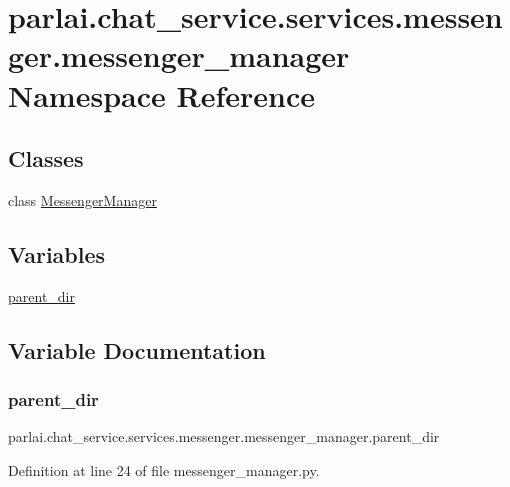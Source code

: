 \hypertarget{namespaceparlai_1_1chat__service_1_1services_1_1messenger_1_1messenger__manager}{}\section{parlai.\+chat\+\_\+service.\+services.\+messenger.\+messenger\+\_\+manager Namespace Reference}
\label{namespaceparlai_1_1chat__service_1_1services_1_1messenger_1_1messenger__manager}
\subsection*{Classes}
\begin{DoxyCompactItemize}
\item 
class \hyperlink{classparlai_1_1chat__service_1_1services_1_1messenger_1_1messenger__manager_1_1MessengerManager}{Messenger\+Manager}
\end{DoxyCompactItemize}
\subsection*{Variables}
\begin{DoxyCompactItemize}
\item 
\hyperlink{namespaceparlai_1_1chat__service_1_1services_1_1messenger_1_1messenger__manager_abfde7568d777b41aafdc401a1324c965}{parent\+\_\+dir}
\end{DoxyCompactItemize}


\subsection{Variable Documentation}
\mbox{\label{namespaceparlai_1_1chat__service_1_1services_1_1messenger_1_1messenger__manager_abfde7568d777b41aafdc401a1324c965}} 
\subsubsection{\texorpdfstring{parent\+\_\+dir}{parent\_dir}}
{\footnotesize\ttfamily parlai.\+chat\+\_\+service.\+services.\+messenger.\+messenger\+\_\+manager.\+parent\+\_\+dir}



Definition at line 24 of file messenger\+\_\+manager.\+py.

